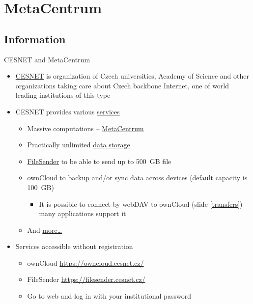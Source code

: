 \documentclass[compress, ucs, xelatex, 11pt, xcolor=svgnames,
  hyperref={
    bookmarks=true,
    unicode=true,
    colorlinks=true,
    pdftitle={Linux, command line and MetaCentrum},
    plainpages=false,
    pdfauthor={Vojtech Zeisek},
    pdfsubject={Course about use of Linux command line, writing shell scripts and using MetaCentrum of CESNET},
    pdfcreator={XeLaTeX},
    pdfkeywords={Linux, GNU, BASH, shell, command line, MetaCentrum},
    linkcolor=Red,
    anchorcolor=Blue,
    citecolor=Purple,
    filecolor=DodgerBlue,
    menucolor=DarkOrchid,
    urlcolor=DeepSkyBlue,
    pdftex},
  url={hyphens, lowtilde} %
  ]{beamer}
\begin{document}
\section{MetaCentrum}

\subsection{Information}

\begin{frame}[allowframebreaks]{CESNET and MetaCentrum}
\begin{itemize}
  \item \href{https://www.cesnet.cz/?lang=en}{CESNET} is organization of Czech universities, Academy of Science and other organizations taking care about Czech backbone Internet, one of world leading institutions of this type
  \item CESNET provides various \href{https://www.cesnet.cz/services/?lang=en}{services}
  \begin{itemize}
    \item Massive computations -- \href{https://www.cesnet.cz/services/massive-computations-metacentrum/?lang=en}{MetaCentrum}
    \item Practically unlimited \href{https://www.cesnet.cz/services/data-storage/?lang=en}{data storage}
    \item \href{https://www.cesnet.cz/services/filesender/?lang=en}{FileSender} to be able to send up to 500~GB file
    \item \href{https://www.cesnet.cz/services/owncloud/?lang=en}{ownCloud} to backup and/or sync data across devices (default capacity is 100~GB)
    \begin{itemize}
      \item It is possible to connect by webDAV to ownCloud (slide \ref{transfers}) -- many applications support it
    \end{itemize}
    \item And \href{https://www.cesnet.cz/services/?lang=en}{more\ldots}
  \end{itemize}
  \item Services accessible without registration
  \begin{itemize}
    \item ownCloud \url{https://owncloud.cesnet.cz/}
    \item FileSender \url{https://filesender.cesnet.cz/}
    \item Go to web and log in with your institutional password
  \end{itemize}

\end{itemize}
\end{frame}
\end{document}
